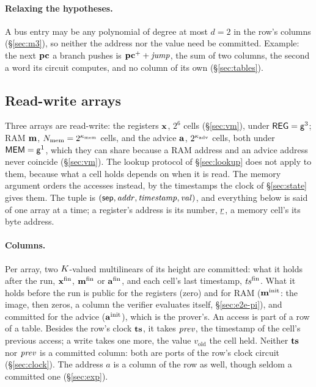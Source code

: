 \paragraph{Relaxing the hypotheses.} A bus entry may be any polynomial of degree at most $d = 2$ in the row's columns (\S\ref{sec:m3}), so neither the address nor the value need be committed. Example: the next $\mathbf{pc}$ a branch pushes is $\mathbf{pc}^{+}+\mathit{jump}$, the sum of two columns, the second a word its circuit computes, and no column of its own (\S\ref{sec:tables}).

\subsection{Read-write arrays}\label{sec:memchan}

Three arrays are read-write: the registers $\mathbf{x}$, $2^{6}$ cells (\S\ref{sec:vm}), under $\mathsf{REG}=\mathsf{g}^{3}$; RAM $\mathbf{m}$, $N_{\mathrm{mem}}=2^{\kappa_{\mathrm{mem}}}$ cells, and the advice $\mathbf{a}$, $2^{\kappa_{\mathrm{adv}}}$ cells, both under $\mathsf{MEM}=\mathsf{g}^{1}$, which they can share because a RAM address and an advice address never coincide (\S\ref{sec:vm}). The lookup protocol of \S\ref{sec:lookup} does not apply to them, because what a cell holds depends on when it is read. The memory argument orders the accesses instead, by the timestamps the clock of \S\ref{sec:state} gives them. The tuple is $( \mathsf{sep},\mathit{addr},\mathit{timestamp},\mathit{val} )$, and everything below is said of one array at a time; a register's address is its number, $\underline{r}$, a memory cell's its byte address.

\paragraph{Columns.} Per array, two $K$-valued multilinears of its height are committed: what it holds after the run, $\mathbf{x}^{\mathrm{fin}}$, $\mathbf{m}^{\mathrm{fin}}$ or $\mathbf{a}^{\mathrm{fin}}$, and each cell's last timestamp, $\mathit{ts}^{\mathrm{fin}}$. What it holds before the run is public for the registers (zero) and for RAM ($\mathbf{m}^{\mathrm{init}}$: the image, then zeros, a column the verifier evaluates itself, \S\ref{sec:e2e-pi}), and committed for the advice ($\mathbf{a}^{\mathrm{init}}$), which is the prover's. An access is part of a row of a table. Besides the row's clock $\mathbf{ts}$, it takes $\mathit{prev}$, the timestamp of the cell's previous access; a write takes one more, the value $v_{\mathrm{old}}$ the cell held. Neither $\mathbf{ts}$ nor $\mathit{prev}$ is a committed column: both are ports of the row's clock circuit (\S\ref{sec:clock}). The address $a$ is a column of the row as well, though seldom a committed one (\S\ref{sec:exp}).

